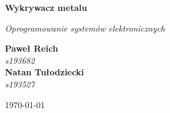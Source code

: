 \begin{titlepage}
    \centering
    \vspace*{4cm}
    
    {\Huge\bfseries Wykrywacz metalu\par}
    \vspace{1cm}
    
    {\Large\itshape Oprogramowanie systemów elektronicznych \par}
    \vspace{3cm}
    
    {\Large
        \textbf{Paweł Reich} \\
        \textit{s193682} \\        
        \vspace{1cm}
        \textbf{Natan Tułodziecki} \\
        \textit{s193527}
    \par}
    
    \vfill
    
    {\large \today \par}
\end{titlepage}

\newpage
